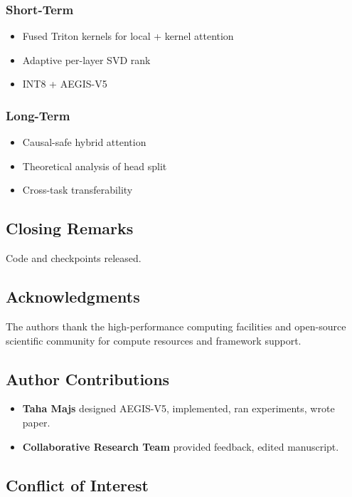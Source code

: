 \subsubsection{Short-Term}
\begin{itemize}
\item Fused Triton kernels for local + kernel attention
\item Adaptive per-layer SVD rank
\item INT8 + AEGIS-V5

\end{itemize}
\subsubsection{Long-Term}
\begin{itemize}
\item Causal-safe hybrid attention
\item Theoretical analysis of head split
\item Cross-task transferability

\end{itemize}
\subsection{Closing Remarks}

Code and checkpoints released.

\subsection{Acknowledgments}

The authors thank the high-performance computing facilities and open-source scientific community for compute resources and framework support.

\subsection{Author Contributions}

\begin{itemize}
\item \textbf{Taha Majs} designed AEGIS-V5, implemented, ran experiments, wrote
  paper.
\item \textbf{Collaborative Research Team} provided feedback, edited manuscript.

\end{itemize}
\subsection{Conflict of Interest}

